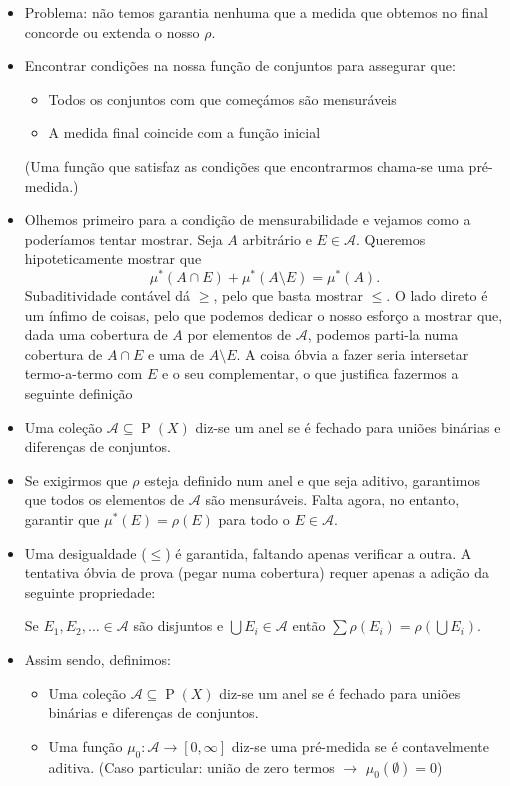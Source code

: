 \documentclass{article}
\DeclareMathOperator{\ps}{P}
\begin{document}
\begin{itemize}
\item Problema: não temos garantia nenhuma que a medida que obtemos no final concorde ou extenda o nosso $\rho$.
\item Encontrar condições na nossa função de conjuntos para assegurar que:
\begin{itemize}
\item Todos os conjuntos com que começámos são mensuráveis
\item A medida final coincide com a função inicial
\end{itemize}
(Uma função que satisfaz as condições que encontrarmos chama-se uma pré-medida.)
\item Olhemos primeiro para a condição de mensurabilidade e vejamos como a poderíamos tentar mostrar. Seja $A$ arbitrário e $E \in \mathcal{A}$. Queremos hipoteticamente mostrar que
\[\mu^*(A \cap E) + \mu^*(A \setminus E) = \mu^*(A).\]
Subaditividade contável dá $\geq$, pelo que basta mostrar $\leq$. O lado direto é um ínfimo de coisas, pelo que podemos dedicar o nosso esforço a mostrar que, dada uma cobertura de $A$ por elementos de $\mathcal{A}$, podemos parti-la numa cobertura de $A \cap E$ e uma de $A \setminus E$. A coisa óbvia a fazer seria intersetar termo-a-termo com $E$ e o seu complementar, o que justifica fazermos a seguinte definição
\item Uma coleção $\mathcal{A} \subseteq \ps(X)$ diz-se um anel se é fechado para uniões binárias e diferenças de conjuntos.
\item Se exigirmos que $\rho$ esteja definido num anel e que seja aditivo, garantimos que todos os elementos de $\mathcal{A}$ são mensuráveis. Falta agora, no entanto, garantir que $\mu^*(E) = \rho(E)$ para todo o $E \in \mathcal{A}$.
\item Uma desigualdade ($\leq$) é garantida, faltando apenas verificar a outra. A tentativa óbvia de prova (pegar numa cobertura) requer apenas a adição da seguinte propriedade:
\begin{center}
Se $E_1, E_2, \dots \in \mathcal{A}$ são disjuntos e $\bigcup E_i \in \mathcal{A}$ então $\sum \rho(E_i) = \rho(\bigcup E_i)$.
\end{center}
\item Assim sendo, definimos:
\begin{itemize}
\item Uma coleção $\mathcal{A} \subseteq \ps(X)$ diz-se um anel se é fechado para uniões binárias e diferenças de conjuntos.
\item Uma função $\mu_0 : \mathcal{A} \to [0,\infty]$ diz-se uma pré-medida se é contavelmente aditiva. (Caso particular: união de zero termos $\rightarrow$ $\mu_0(\emptyset) = 0$)

\end{itemize}
\end{itemize}
\end{document}
